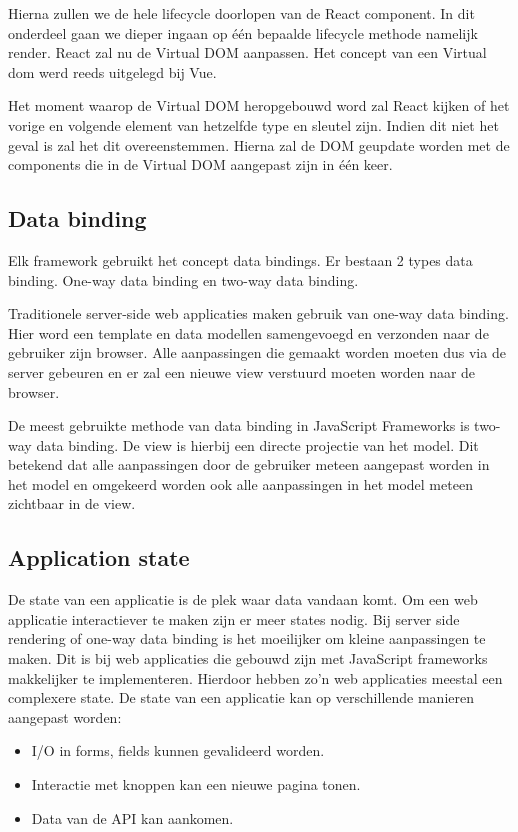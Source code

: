 Hierna zullen we de hele lifecycle doorlopen van de React component. In dit onderdeel gaan we dieper ingaan op één bepaalde lifecycle methode namelijk render. React zal nu de Virtual DOM aanpassen. Het concept van een Virtual dom werd reeds uitgelegd bij Vue.

Het moment waarop de Virtual DOM heropgebouwd word zal React kijken of het vorige en volgende element van hetzelfde type en sleutel zijn. Indien dit niet het geval is zal het dit overeenstemmen. Hierna zal de DOM geupdate worden met de components die in de Virtual DOM aangepast zijn in één keer.

\subsection{Data binding}
\label{sec:Data_Binding}
Elk framework gebruikt het concept data bindings. Er bestaan 2 types data binding. One-way data binding en two-way data binding.

Traditionele server-side web applicaties maken gebruik van one-way data binding. Hier word een template en data modellen samengevoegd en verzonden naar de gebruiker zijn browser. Alle aanpassingen die gemaakt worden moeten dus via de server gebeuren en er zal een nieuwe view verstuurd moeten worden naar de browser.

De meest gebruikte methode van data binding in JavaScript Frameworks is two-way data binding. De view is hierbij een directe projectie van het model. Dit betekend dat alle aanpassingen door de gebruiker meteen aangepast worden in het model en omgekeerd worden ook alle aanpassingen in het model meteen zichtbaar in de view.

\subsection{Application state}
\label{sec:Application_state}
De state van een applicatie is de plek waar data vandaan komt. Om een web applicatie interactiever te maken zijn er meer states nodig. Bij server side rendering of one-way data binding is het moeilijker om kleine aanpassingen te maken. Dit is bij web applicaties die gebouwd zijn met JavaScript frameworks makkelijker te implementeren. Hierdoor hebben zo’n web applicaties meestal een complexere state. De state van een applicatie kan op verschillende manieren aangepast worden:

\begin{itemize}
	\item I/O in forms, fields kunnen gevalideerd worden.
	\item Interactie met knoppen kan een nieuwe pagina tonen.
	\item Data van de API kan aankomen.
\end{itemize}

